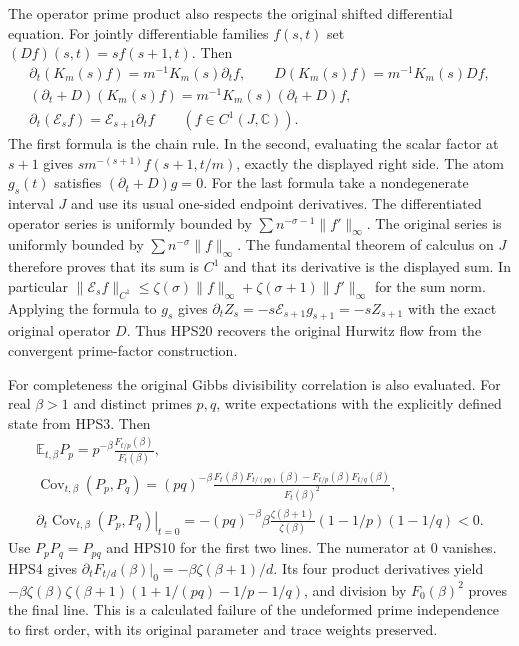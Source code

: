 The operator prime product also respects the
original shifted differential equation.
For jointly differentiable families $f(s,t)$ set
$(Df)(s,t)=sf(s+1,t)$. Then
\begin{equation}\tag{HPS20}
\begin{gathered}
 \partial_t(K_m(s)f)
           =m^{-1}K_m(s)\partial_tf,\qquad
 D(K_m(s)f)=m^{-1}K_m(s)Df,\\
 (\partial_t+D)(K_m(s)f)
           =m^{-1}K_m(s)(\partial_t+D)f,\\
 \partial_t(\mathcal E_sf)
            =\mathcal E_{s+1}\partial_tf
                         \qquad(f\in C^1(J,\mathbb C)).
\end{gathered}
\end{equation}
The first formula is the chain rule. In the
second, evaluating the scalar factor at $s+1$
gives $s m^{-(s+1)}f(s+1,t/m)$, exactly the
displayed right side. The atom $g_s(t)$
satisfies $(\partial_t+D)g=0$.
For the last formula take a nondegenerate
interval $J$ and use its usual one-sided
endpoint derivatives. The differentiated
operator series is uniformly bounded by
$\sum n^{-\sigma-1}\|f'\|_\infty$.
The original series is uniformly bounded by
$\sum n^{-\sigma}\|f\|_\infty$.
The fundamental theorem of calculus on $J$
therefore proves that its sum is $C^1$
and that its derivative is the displayed
sum. In particular
$\|\mathcal E_sf\|_{C^1}
\le\zeta(\sigma)\|f\|_\infty
+\zeta(\sigma+1)\|f'\|_\infty$
for the sum norm. Applying the formula to
$g_s$ gives
$\partial_tZ_s=-s\mathcal E_{s+1}g_{s+1}
=-s Z_{s+1}$ with the exact original
operator $D$. Thus HPS20 recovers the
original Hurwitz flow from the convergent
prime-factor construction.

For completeness the original Gibbs divisibility
correlation is also evaluated. For real $\beta>1$
and distinct primes $p,q$, write expectations with
the explicitly defined state from HPS3. Then
\begin{equation}\tag{HPS21}
\begin{gathered}
 \mathbb E_{t,\beta}P_p
     =p^{-\beta}\frac{F_{t/p}(\beta)}{F_t(\beta)},\\
 \operatorname{Cov}_{t,\beta}(P_p,P_q)
  =(pq)^{-\beta}
       \frac{F_t(\beta)F_{t/(pq)}(\beta)
                    -F_{t/p}(\beta)F_{t/q}(\beta)}
            {F_t(\beta)^2},\\
 \left.\partial_t\operatorname{Cov}_{t,\beta}(P_p,P_q)
        \right|_{t=0}
  =-(pq)^{-\beta}\beta
       \frac{\zeta(\beta+1)}{\zeta(\beta)}
                         (1-1/p)(1-1/q)<0.
\end{gathered}
\end{equation}
Use $P_pP_q=P_{pq}$ and HPS10 for the first
two lines. The numerator at $0$ vanishes.
HPS4 gives
$\partial_tF_{t/d}(\beta)|_0
=-\beta\zeta(\beta+1)/d$.
Its four product derivatives yield
$-\beta\zeta(\beta)\zeta(\beta+1)
(1+1/(pq)-1/p-1/q)$, and division by
$F_0(\beta)^2$ proves the final line.
This is a calculated failure of the undeformed
prime independence to first order, with its
original parameter and trace weights preserved.


